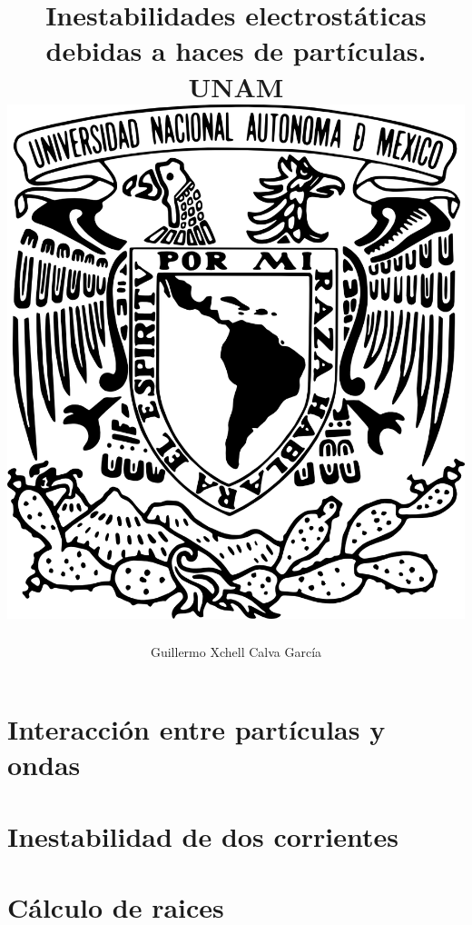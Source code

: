 \documentclass[12pt,letterpaper]{report}
\title{
	{Inestabilidades electrostáticas debidas a haces de partículas.}\\
	{\large UNAM}\\
	{\includegraphics{Escudo-UNAM-transparente.png}}
}
\author{Guillermo Xchell Calva García}
\date{}
\begin{document}
\maketitle
%
%
%

\tableofcontents
\listoffigures
{}
\selectfont
\chapter{Interacción entre partículas y ondas}

\chapter{Inestabilidad de dos corrientes}


\appendix
\chapter{Cálculo de raices}
\label{Ap:raices}

\cleardoublepage{}
{}


\end{document}

